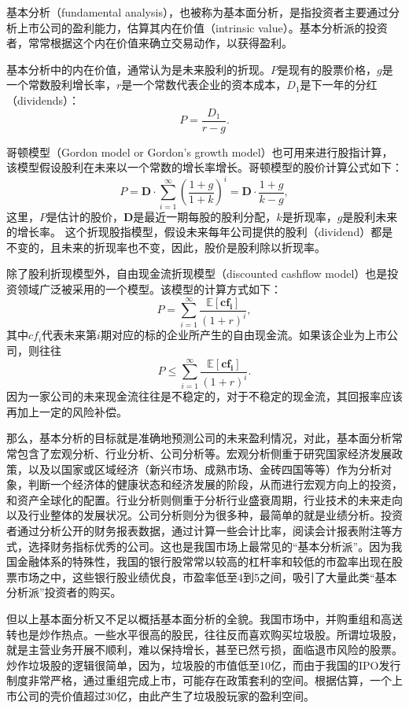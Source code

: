 \documentclass[twoside,longtitle]{LZUthesis}
\begin{document}
基本分析（fundamental analysis）\cite{benjisming2009}，也被称为基本面分析，是指投资者主要通过分析上市公司的盈利能力，估算其内在价值（intrinsic value）。基本分析派的投资者，常常根据这个内在价值来确立交易动作，以获得盈利。

基本分析中的内在价值，通常认为是未来股利的折现。$P$是现有的股票价格，$g$是一个常数股利增长率，$r$是一个常数代表企业的资本成本，$D_1$是下一年的分红（dividends）：
\[
P=\frac{D_1}{r-g}.
\]

哥顿模型（Gordon model or Gordon's growth model）也可用来进行股指计算，该模型假设股利在未来以一个常数的增长率增长。哥顿模型\cite{hamada1969portfolio}的股价计算公式如下：
\[
P=\mathbf{D}\cdot\sum_{i=1}^{\infty}\left(\frac{1+g}{1+k}\right)^i=\mathbf{D}\cdot\frac{1+g}{k-g},
\]
这里，$P$是估计的股价，$\mathbf{D}$是最近一期每股的股利分配，$k$是折现率，$g$是股利未来的增长率。
这个折现股指模型，假设未来每年公司提供的股利（dividend）都是不变的，且未来的折现率也不变，因此，股价是股利除以折现率。

除了股利折现模型外，自由现金流折现模型（discounted cashflow model）也是投资领域广泛被采用的一个模型。该模型的计算方式如下：
\[
P=\sum_{i=1}^{\infty}\frac{\mathbb{E}[\mathbf{cf_i}]}{(1+r)^i},
\]
其中$cf_i$代表未来第$i$期对应的标的企业所产生的自由现金流。如果该企业为上市公司，则往往
\[
P\le\sum_{i=1}^{\infty}\frac{\mathbb{E}[\mathbf{cf_i}]}{(1+r)^i}.
\]
因为一家公司的未来现金流往往是不稳定的，对于不稳定的现金流，其回报率应该再加上一定的风险补偿。

那么，基本分析的目标就是准确地预测公司的未来盈利情况，对此，基本面分析常常包含了宏观分析、行业分析、公司分析等。宏观分析侧重于研究国家经济发展政策，以及以国家或区域经济（新兴市场、成熟市场、金砖四国等等）作为分析对象，判断一个经济体的健康状态和经济发展的阶段，从而进行宏观方向上的投资，和资产全球化的配置。行业分析则侧重于分析行业盛衰周期，行业技术的未来走向以及行业整体的发展状况。公司分析则分为很多种，最简单的就是业绩分析。投资者通过分析公开的财务报表数据，通过计算一些会计比率，阅读会计报表附注等方式，选择财务指标优秀的公司。这也是我国市场上最常见的“基本分析派”。因为我国金融体系的特殊性，我国的银行股常常以较高的杠杆率和较低的市盈率出现在股票市场之中，这些银行股业绩优良，市盈率低至4到5之间，吸引了大量此类“基本分析派”投资者的购买。

但以上基本面分析又不足以概括基本面分析的全貌。我国市场中，并购重组和高送转也是炒作热点。一些水平很高的股民，往往反而喜欢购买垃圾股。所谓垃圾股，就是主营业务开展不顺利，难以保持增长，甚至已然亏损，面临退市风险的股票。炒作垃圾股的逻辑很简单，因为，垃圾股的市值低至10亿，而由于我国的IPO发行制度非常严格，通过重组完成上市，可能存在政策套利的空间。根据估算，一个上市公司的壳价值超过30亿，由此产生了垃圾股玩家的盈利空间。
\end{document}
